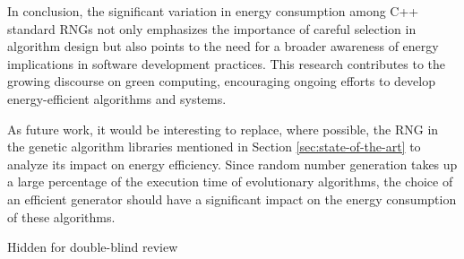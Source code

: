 \documentclass[dvipsnames,format=sigconf,anonymous=true,review=true]{acmart}
\begin{document}
In conclusion, the significant variation in energy consumption among C++ standard RNGs not only emphasizes the importance of careful selection in algorithm design but also points to the need for a broader awareness of energy implications in software development practices. This research contributes to the growing discourse on green computing, encouraging ongoing efforts to develop energy-efficient algorithms and systems.

As future work, it would be interesting to replace, where possible, the RNG in the genetic algorithm libraries mentioned in Section \ref{sec:state-of-the-art} to analyze its impact on energy efficiency. Since random number generation takes up a large percentage of the execution time of evolutionary algorithms, the choice of an efficient generator should have a significant impact on the energy consumption of these algorithms.

\begin{acks}
Hidden for double-blind review
\end{acks}



\end{document}
